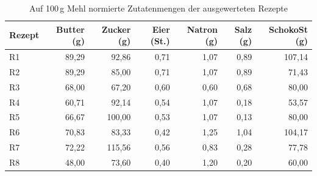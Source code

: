 \begin{table}
\centering
\caption{Auf 100\,g Mehl normierte Zutatenmengen der ausgewerteten Rezepte}
\label{table:rezepte_relativ}
\footnotesize
\setlength{\tabcolsep}{4pt}
\begin{tabular}{|l|r|r|r|r|r|r|}
\hline
Rezept & Butter (g) & Zucker (g) & Eier (St.) & Natron (g) & Salz (g) & SchokoSt (g) \\
\hline
R1     & 89,29      & 92,86      & 0,71       & 1,07       & 0,89     & 107,14    \\
R2     & 89,29      & 85,00      & 0,71       & 1,07       & 0,89     & 71,43     \\
R3     & 68,00      & 67,20      & 0,60       & 0,60       & 0,68     & 80,00     \\
R4     & 60,71      & 92,14      & 0,54       & 1,07       & 0,18     & 53,57     \\
R5     & 66,67      & 100,00     & 0,53       & 1,07       & 0,13     & 80,00     \\
R6     & 70,83      & 83,33      & 0,42       & 1,25       & 1,04     & 104,17    \\
R7     & 72,22      & 115,56     & 0,56       & 0,83       & 0,28     & 77,78     \\
R8     & 48,00      & 73,60      & 0,40       & 1,20       & 0,20     & 60,00     \\
\hline
\end{tabular}
\end{table}




